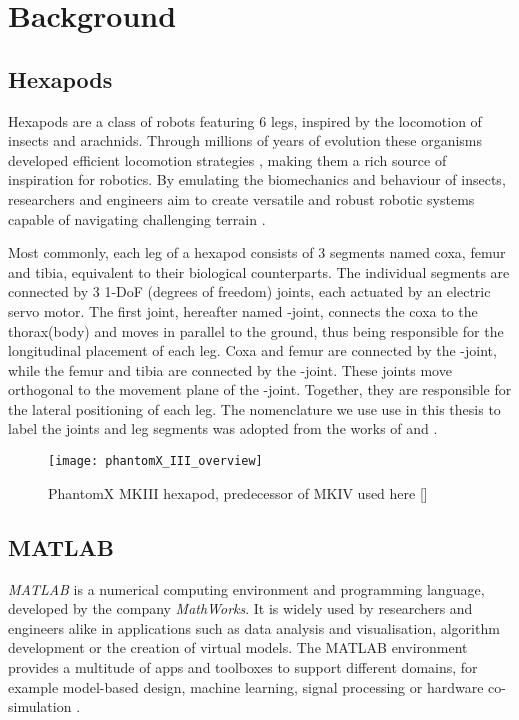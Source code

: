 \chapter{Background}
\label{ch:background}

\section{Hexapods} \label{sec: Hexapods}
Hexapods are a class of robots featuring 6 legs, inspired by the locomotion of insects and arachnids.
Through millions of years of evolution these organisms developed efficient locomotion strategies \parencite{neville2006bipedal}, making them a rich source of inspiration for robotics.
By emulating the biomechanics and behaviour of insects, researchers and engineers aim to create versatile and robust robotic systems capable of navigating challenging terrain \parencite{irawan2011optimal, ouyang2021adaptive, schilling2013walknet}.

Most commonly, each leg of a hexapod consists of 3 segments named coxa, femur and tibia, equivalent to their biological counterparts.
The individual segments are connected by 3 1-DoF (degrees of freedom) joints, each actuated by an electric servo motor.
The first joint, hereafter named \textalpha-joint, connects the coxa to the thorax(body) and moves in parallel to the ground, thus being responsible for the longitudinal placement of each leg.
Coxa and femur are connected by the \textbeta-joint, while the femur and tibia are connected by the \textgamma-joint. 
These joints move orthogonal to the movement plane of the \textalpha-joint. Together, they are responsible for the lateral positioning of each leg.
The nomenclature we use use in this thesis to label the joints and leg segments was adopted from the works of \cite{schilling2013walknet} and \cite{HeterarchicalArchitectureSchilling}.
\begin{figure}[h]
	\centerline{\texttt{[image: phantomX\_III\_overview]}}
	\caption{PhantomX MKIII hexapod, predecessor of MKIV used here [\cite{PhantomX_MKIII}]}
	\label{figure: PhantomX MKIII}
\end{figure}




\section{MATLAB}
\textit{MATLAB\textsuperscript{\textregistered}} is a numerical computing environment and programming language, developed by the company \textit{MathWorks\textsuperscript{\textregistered}}.
It is widely used by researchers and engineers alike in applications such as data analysis and visualisation, algorithm development or the creation of virtual models.
The MATLAB environment provides a multitude of apps and toolboxes to support different domains, for example model-based design, machine learning, signal processing or hardware co-simulation \parencite{MATLAB}.

